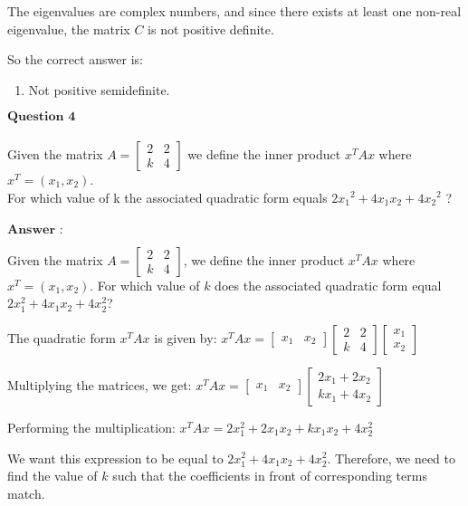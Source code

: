\documentclass[11pt]{article}
\providecommand{\tightlist}{%
      \setlength{\itemsep}{0pt}\setlength{\parskip}{0pt}}
\begin{document}
The eigenvalues are complex numbers, and since there exists at least one
non-real eigenvalue, the matrix $C $ is not positive definite.

So the correct answer is:

\begin{enumerate}
\def\labelenumi{\alph{enumi}.}
\tightlist
\item
  Not positive semidefinite.
\end{enumerate}

    $\textbf{Question 4}$\\
~\\
Given the matrix $A=\begin{bmatrix} 2 & 2 \\ k & 4 \end{bmatrix}$ we
define the inner product $x^TAx$ where $x^T=(x_1,x_2)$.\\
For which value of k the associated quadratic form equals
$2x{_1}^2+4x_1x_2+4x{_2}^2$ ?\\
~\\
$\textbf{Answer :}$

    Given the matrix $A = \begin{bmatrix} 2 & 2 \\ k & 4 \end{bmatrix}$,
we define the inner product $x^TAx$ where $x^T = (x_1, x_2)$. For
which value of $k$ does the associated quadratic form equal
$2x_1^2 + 4x_1x_2 + 4x_2^2$?

The quadratic form $x^TAx$ is given by:
$x^TAx = \begin{bmatrix} x_1 & x_2 \end{bmatrix} \begin{bmatrix} 2 & 2 \\ k & 4 \end{bmatrix} \begin{bmatrix} x_1 \\ x_2 \end{bmatrix}$

Multiplying the matrices, we get:
$x^TAx = \begin{bmatrix} x_1 & x_2 \end{bmatrix} \begin{bmatrix} 2x_1 + 2x_2 \\ kx_1 + 4x_2 \end{bmatrix}$

Performing the multiplication:
$x^TAx = 2x_1^2 + 2x_1x_2 + kx_1x_2 + 4x_2^2$

We want this expression to be equal to $2x_1^2 + 4x_1x_2 + 4x_2^2$.
Therefore, we need to find the value of $k$ such that the coefficients
in front of corresponding terms match.
\end{document}

